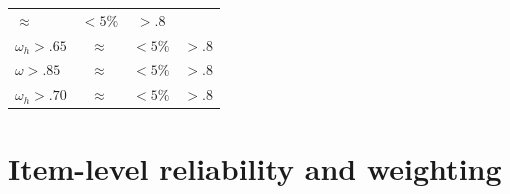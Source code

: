 \documentclass[]{book}
\begin{document}
\begin{longtable}[]{@{}lccc@{}}
\begin{minipage}[t]{0.15\columnwidth}
\(\approx\)\strut
\end{minipage} & \begin{minipage}[t]{0.28\columnwidth}\centering
\(<5\%\)\strut
\end{minipage} & \begin{minipage}[t]{0.12\columnwidth}\centering
\(>.8\)\strut
\end{minipage}\tabularnewline
\begin{minipage}[t]{0.21\columnwidth}\raggedright
\(\omega_h>.65\)\strut
\end{minipage} & \begin{minipage}[t]{0.15\columnwidth}\centering
\(\approx\)\strut
\end{minipage} & \begin{minipage}[t]{0.28\columnwidth}\centering
\(<5\%\)\strut
\end{minipage} & \begin{minipage}[t]{0.12\columnwidth}\centering
\(>.8\)\strut
\end{minipage}\tabularnewline
\begin{minipage}[t]{0.21\columnwidth}\raggedright
\(\omega>.85\)\strut
\end{minipage} & \begin{minipage}[t]{0.15\columnwidth}\centering
\(\approx\)\strut
\end{minipage} & \begin{minipage}[t]{0.28\columnwidth}\centering
\(<5\%\)\strut
\end{minipage} & \begin{minipage}[t]{0.12\columnwidth}\centering
\(>.8\)\strut
\end{minipage}\tabularnewline
\begin{minipage}[t]{0.21\columnwidth}\raggedright
\(\omega_h>.70\)\strut
\end{minipage} & \begin{minipage}[t]{0.15\columnwidth}\centering
\(\approx\)\strut
\end{minipage} & \begin{minipage}[t]{0.28\columnwidth}\centering
\(<5\%\)\strut
\end{minipage} & \begin{minipage}[t]{0.12\columnwidth}\centering
\(>.8\)\strut
\end{minipage}\tabularnewline
\bottomrule
\end{longtable}

\hypertarget{item-level-reliability-and-weighting}{%
\section{Item-level reliability and weighting}\label{item-level-reliability-and-weighting}}
\end{document}
